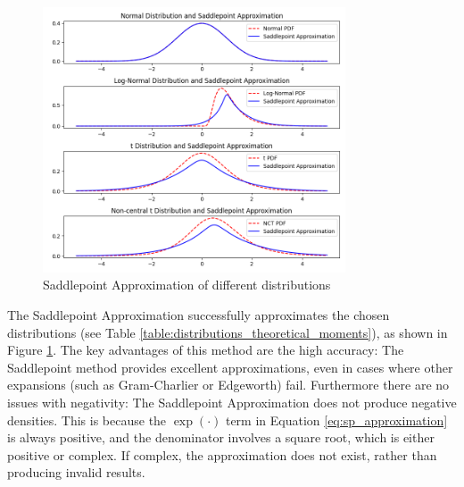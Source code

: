 \begin{figure}[h]
    \centering
    \includegraphics[width=0.8\textwidth]{img/saddle_approximation.png}
    \caption{Saddlepoint Approximation of different distributions}
    \label{fig:sp_approximation}
\end{figure}

The Saddlepoint Approximation successfully approximates the chosen distributions (see Table \ref{table:distributions_theoretical_moments}), as shown in Figure \ref{fig:sp_approximation}. The key advantages of this method are the high accuracy: The Saddlepoint method provides excellent approximations, even in cases where other expansions (such as Gram-Charlier or Edgeworth) fail. Furthermore there are no issues with negativity: The Saddlepoint Approximation does not produce negative densities. This is because the $\exp(\cdot)$ term in Equation \eqref{eq:sp_approximation} is always positive, and the denominator involves a square root, which is either positive or complex. If complex, the approximation does not exist, rather than producing invalid results.
